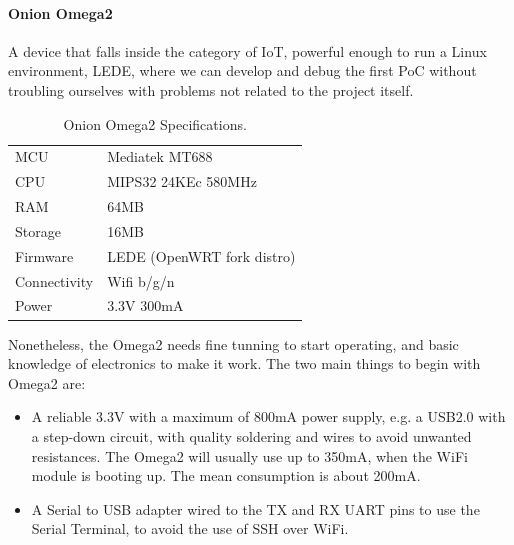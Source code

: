 \paragraph{Onion Omega2} A device that falls inside the category of IoT, powerful enough to run a Linux environment, LEDE, where we can develop and debug the first PoC without troubling ourselves with problems not related to the project itself.


\begin{table}[h]
	\myfloatalign
	\begin{tabularx}{0.75\textwidth}{ll} \toprule
		MCU & Mediatek MT688 \citep{MT7688} \\
		CPU & MIPS32 24KEc 580MHz \\
		RAM & 64MB \\
		Storage & 16MB \\
		Firmware & LEDE (OpenWRT fork distro) \\
		Connectivity & Wifi b/g/n \\
		Power & 3.3V 300mA \\
		\bottomrule
	\end{tabularx}
	\caption[Onion Omega 2 Specifications]{Onion Omega2 Specifications.}
	\label{tab:Omega2Specs}
\end{table}



Nonetheless, the Omega2 needs fine tunning to start operating, and basic knowledge of electronics to make it work. The two main things to begin with Omega2 are:
\begin{itemize}
	\item A reliable 3.3V with a maximum of 800mA power supply, e.g. a USB2.0 with a step-down circuit, with quality soldering and wires to avoid unwanted resistances. The Omega2 will usually use up to 350mA, when the WiFi module is booting up. The mean consumption is about 200mA.
	\item A Serial to USB adapter wired to the TX and RX UART pins to use the Serial Terminal, to avoid the use of SSH over WiFi.
\end{itemize}

